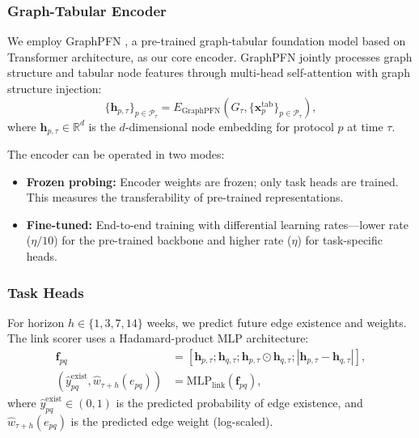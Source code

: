 \documentclass[preprint,12pt]{elsarticle}
\renewcommand{\paragraph}[1]{}
\begin{document}
\subsubsection{Graph-Tabular Encoder}
We employ GraphPFN \cite{eremeev2025g2tfm}, a pre-trained graph-tabular foundation model based on Transformer architecture, as our core encoder. GraphPFN jointly processes graph structure and tabular node features through multi-head self-attention with graph structure injection:
\begin{equation}
\{\mathbf{h}_{p,\tau}\}_{p\in\mathcal{P}_{\tau}} = E_{\mathrm{GraphPFN}}\!\left(G_{\tau}, \{\mathbf{x}^{\mathrm{tab}}_{p}\}_{p\in\mathcal{P}_{\tau}}\right),
\end{equation}
where $\mathbf{h}_{p,\tau}\in\mathbb{R}^d$ is the $d$-dimensional node embedding for protocol $p$ at time $\tau$.

The encoder can be operated in two modes:
\begin{itemize}
  \item \textbf{Frozen probing:} Encoder weights are frozen; only task heads are trained. This measures the transferability of pre-trained representations.
  \item \textbf{Fine-tuned:} End-to-end training with differential learning rates---lower rate ($\eta/10$) for the pre-trained backbone and higher rate ($\eta$) for task-specific heads.
\end{itemize}

\subsubsection{Task Heads}
\paragraph{(1) Multi-step forecasting.}
For horizon $h\in\{1,3,7,14\}$ weeks, we predict future edge existence and weights. The link scorer uses a Hadamard-product MLP architecture:
\begin{align}
\mathbf{f}_{pq} &= [\mathbf{h}_{p,\tau}; \mathbf{h}_{q,\tau}; \mathbf{h}_{p,\tau}\odot\mathbf{h}_{q,\tau}; |\mathbf{h}_{p,\tau}-\mathbf{h}_{q,\tau}|],\\
(\widehat{y}^{\mathrm{exist}}_{pq}, \widehat{w}_{\tau+h}(e_{pq})) &= \mathrm{MLP}_{\mathrm{link}}(\mathbf{f}_{pq}),
\end{align}
where $\widehat{y}^{\mathrm{exist}}_{pq}\in(0,1)$ is the predicted probability of edge existence, and $\widehat{w}_{\tau+h}(e_{pq})$ is the predicted edge weight (log-scaled).
\end{document}
